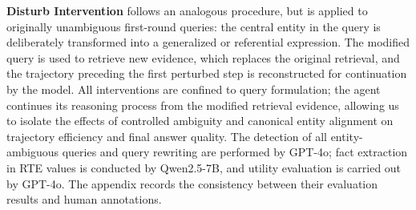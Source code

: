 \documentclass{article} %
\begin{document}
\textbf{Disturb Intervention} follows an analogous procedure, but is applied to originally unambiguous first-round queries: the central entity in the query is deliberately transformed into a generalized or referential expression. The modified query is used to retrieve new evidence, which replaces the original retrieval, and the trajectory preceding the first perturbed step is reconstructed for continuation by the model.
All interventions are confined to query formulation; the agent continues its reasoning process from the modified retrieval evidence, allowing us to isolate the effects of controlled ambiguity and canonical entity alignment on trajectory efficiency and final answer quality.
The detection of all entity-ambiguous queries and query rewriting are performed by GPT-4o; fact extraction in RTE values is conducted by Qwen2.5-7B, and utility evaluation is carried out by GPT-4o. The appendix records the consistency between their evaluation results and human annotations.

\end{document}
